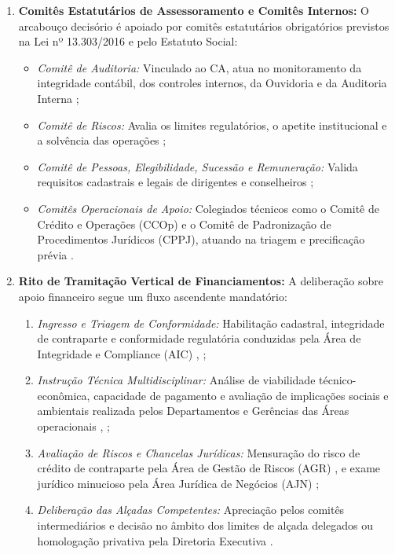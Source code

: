 \begin{enumerate}[label=\textbf{\alph*)}]
    \item \textbf{Comitês Estatutários de Assessoramento e Comitês Internos:} O arcabouço decisório é apoiado por comitês estatutários obrigatórios previstos na Lei nº 13.303/2016 e pelo Estatuto Social:
          \begin{itemize}
              \item \emph{Comitê de Auditoria:} Vinculado ao CA, atua no monitoramento da integridade contábil, dos controles internos, da Ouvidoria e da Auditoria Interna \cite[arts.~52, 53 e 57]{bndes2025estatuto};
              \item \emph{Comitê de Riscos:} Avalia os limites regulatórios, o apetite institucional e a solvência das operações \cite[arts.~17,~VI e 61]{bndes2025estatuto};
              \item \emph{Comitê de Pessoas, Elegibilidade, Sucessão e Remuneração:} Valida requisitos cadastrais e legais de dirigentes e conselheiros \cite[arts.~21, 59 e 60]{bndes2025estatuto};
              \item \emph{Comitês Operacionais de Apoio:} Colegiados técnicos como o Comitê de Crédito e Operações (CCOp) e o Comitê de Padronização de Procedimentos Jurídicos (CPPJ), atuando na triagem e precificação prévia \cite[p.~21, 35, 163, 172]{bndes2026oib}.
          \end{itemize}

    \item \textbf{Rito de Tramitação Vertical de Financiamentos:} A deliberação sobre apoio financeiro segue um fluxo ascendente mandatório:
          \begin{enumerate}[label=\arabic*.]
              \item \emph{Ingresso e Triagem de Conformidade:} Habilitação cadastral, integridade de contraparte e conformidade regulatória conduzidas pela Área de Integridade e Compliance (AIC) \cite[arts.~7º,~III e 74,~IX e XI]{bndes2025estatuto}, \cite[p.~21, alínea ``q'']{bndes2026oib};
              \item \emph{Instrução Técnica Multidisciplinar:} Análise de viabilidade técnico-econômica, capacidade de pagamento e avaliação de implicações sociais e ambientais realizada pelos Departamentos e Gerências das Áreas operacionais \cite[art.~7º,~I]{bndes2025estatuto}, \cite[p.~45, 63]{bndes2026oib};
              \item \emph{Avaliação de Riscos e Chancelas Jurídicas:} Mensuração do risco de crédito de contraparte pela Área de Gestão de Riscos (AGR) \cite[art.~74]{bndes2025estatuto}, \cite[p.~35, 138]{bndes2026oib} e exame jurídico minucioso pela Área Jurídica de Negócios (AJN) \cite[p.~171--172]{bndes2026oib};
              \item \emph{Deliberação das Alçadas Competentes:} Apreciação pelos comitês intermediários e decisão no âmbito dos limites de alçada delegados ou homologação privativa pela Diretoria Executiva \cite[art.~43,~III e Parágrafo Único,~I]{bndes2025estatuto}.
          \end{enumerate}
\end{enumerate}

